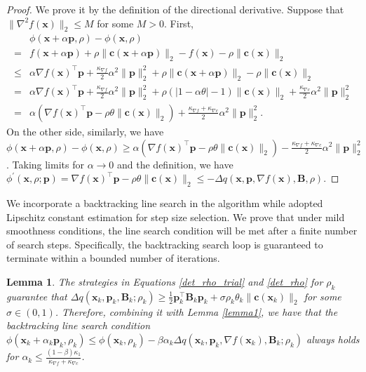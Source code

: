 \documentclass[aos]{imsart}
\numberwithin{equation}{section}
\theoremstyle{plain}
\newtheorem{lemma}{Lemma}
\begin{document}
\begin{appendix}
 \begin{proof}
     We prove it by the definition of the directional derivative. Suppose that $\|\nabla^2 f(\bm{x})\|_2 \leq M$ for some $M>0$. First, 
     \begin{equation}
     \label{eq1}
         \begin{split}
             & \phi(\bm{x}+\alpha \bm{p},\rho) - \phi(\bm{x},\rho) \\
             = & f(\bm{x}+ \alpha \bm{p}) + \rho \|\bm{c}(\bm{x}+\alpha \bm{p})\|_2 - f(\bm{x}) -  \rho \|\bm{c}(\bm{x})\|_2 \\
             \leq & \alpha \nabla f(\bm{x})^{\top} \bm{p} + \frac{\kappa_{\nabla f}}{2} \alpha^2 \|\bm{p}\|_2^2 + \rho \|\bm{c}(\bm{x}+\alpha \bm{p})\|_2 - \rho \|\bm{c}(\bm{x})\|_2\\
             = &  \alpha \nabla f(\bm{x})^{\top} \bm{p} + \frac{\kappa_{\nabla f}}{2} \alpha^2 \|\bm{p}\|_2^2 + \rho \left( \left| 1- \alpha \theta \right| - 1 \right) \|\bm{c}(\bm{x})\|_2 + \frac{\kappa_{\nabla c}}{2}\alpha^2 \|\bm{p}\|_2^2\\
             = & \alpha \left(\nabla f(\bm{x})^{\top} \bm{p} - \rho \theta \|\bm{c}(\bm{x})\|_2 \right) + \frac{\kappa_{\nabla f}+\kappa_{\nabla c}}{2} \alpha^2 \|\bm{p}\|_2^2.
         \end{split}
     \end{equation}
     On the other side, similarly, we have $\phi(\bm{x}+\alpha \bm{p},\rho) - \phi(\bm{x},\rho) \geq \alpha \left(\nabla f(\bm{x})^{\top} \bm{p} - \rho \theta \|\bm{c}(\bm{x})\|_2 \right) - \frac{\kappa_{\nabla f}+\kappa_{\nabla c}}{2} \alpha^2 \|\bm{p}\|_2^2$. Taking limits for $\alpha \to 0$ and the definition, we have $\phi^{\prime}(\bm{x},\rho;\bm{p})  = \nabla f(\bm{x})^{\top} \bm{p} - \rho \theta \|\bm{c}(\bm{x})\|_2 \leq -\Delta q(\bm{x},\bm{p},\nabla f(\bm{x}),\bm{B},\rho)$.
 \end{proof}


We incorporate a backtracking line search in the algorithm while \cite{berahas2021sequential} adopted Lipschitz constant estimation for step size selection. We prove that under mild smoothness conditions, the line search condition will be met after a finite number of search steps. Specifically, the backtracking search loop is guaranteed to terminate within a bounded number of iterations.
 \begin{lemma}
 \label{lemma2}
     The strategies in Equations \eqref{det_rho_trial} and \eqref{det_rho} for $\rho_k$ guarantee that $\Delta q(\bm{x}_k,\bm{p}_k,\bm{B}_k;\rho_k) \geq \frac{1}{2} \bm{p}_k^{\top} \bm{B}_k \bm{p}_k + \sigma \rho_k \theta_k \|\bm{c}(\bm{x}_k)\|_2$ for some $\sigma \in (0,1)$. Therefore, combining it with Lemma \ref{lemma1}, we have that the backtracking line search condition $\phi(\bm{x}_k+\alpha_k\bm{p}_k,\rho_k) \leq \phi(\bm{x}_k,\rho_k) - \beta \alpha_k \Delta q(\bm{x}_k,\bm{p}_k,\nabla f(\bm{x}_k),\bm{B}_k;\rho_k)$ always holds for $\alpha_k \leq \frac{(1-\beta)\kappa_1}{\kappa_{\nabla f}+\kappa_{\nabla c}}$.
 \end{lemma}


\end{appendix}
\end{document}
